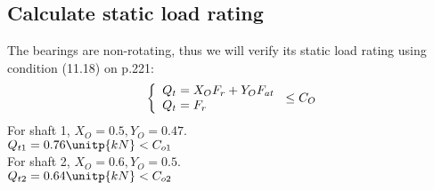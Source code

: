\subsection{Calculate static load rating}
The bearings are non-rotating, thus we will verify its static load rating using condition (11.18) on p.221:
\[\left\{\begin{array}{l@{{}={}}l}
Q_t & X_OF_r+Y_OF_{at}\\
Q_t & F_r
\end{array}\right. \leq C_O\]
For shaft 1, $ X_O=0.5, Y_O=0.47$.\\
$ Q_{t1}  = 0.76 \unitp{kN} < C_{o1}$\\
For shaft 2, $X_O =0.6,Y_O=0.5  $.\\
$ Q_{t2}  = 0.64 \unitp{kN} < C_{o2}$